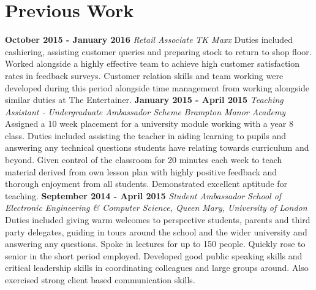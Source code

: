\section*{Previous Work}
\noindent
\textbf{October 2015 - January 2016} \newline
\indent \textit{Retail Associate} \newline
\indent \textit{TK Maxx} \newline 
\linebreak
\indent Duties included cashiering, assisting customer queries and preparing stock to return to shop floor. Worked alongside a highly effective team to achieve high customer satisfaction rates in feedback surveys. Customer relation skills and team working were developed during this period alongside time management from working alongside similar duties at The Entertainer.  \newline
\linebreak
\smallskip 
\noindent 
\textbf{January 2015 - April 2015} \newline
\indent \textit{Teaching Assistant - Undergraduate Ambassador Scheme} \newline
\indent \textit{Brampton Manor Academy} \newline 
\linebreak
\indent Assigned a 10 week placement for a university module working with a year 8 class. Duties included assisting the teacher in aiding learning to pupils and answering any technical questions students have relating towards curriculum and beyond. Given control of the classroom for 20 minutes each week to teach material derived from own lesson plan with highly positive feedback and thorough enjoyment from all students. Demonstrated excellent aptitude for teaching. \newline
\smallskip
\linebreak
\noindent 
\textbf{September 2014 - April 2015} \newline
\indent \textit{Student Ambassador} \newline
\indent \textit{School of Electronic Engineering \& Computer Science, Queen Mary, University of London} \newline 
\linebreak
\indent Duties included giving warm welcomes to perspective students, parents and third party delegates, guiding in tours around the school and the wider university and answering any questions. Spoke in lectures for up to 150 people. Quickly rose to senior in the short period employed. Developed good public speaking skills and critical leadership skills in coordinating colleagues and large groups around. Also exercised strong client based communication skills. \newline


